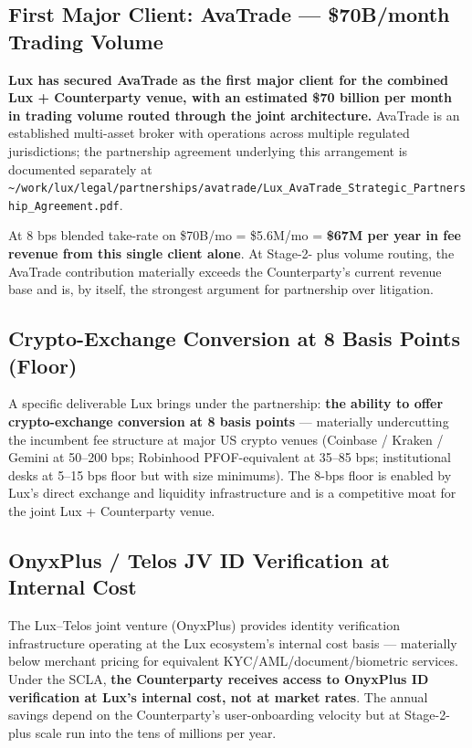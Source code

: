 \documentclass[11pt,letterpaper]{article}
\begin{document}
\subsection*{First Major Client: AvaTrade --- \$70B/month Trading Volume}

\textbf{Lux has secured AvaTrade as the first major client for the
combined Lux + Counterparty venue, with an estimated \$70 billion
per month in trading volume routed through the joint architecture.}
AvaTrade is an established multi-asset broker with operations across
multiple regulated jurisdictions; the partnership agreement
underlying this arrangement is documented separately at
\texttt{\textasciitilde/work/lux/legal/partnerships/avatrade/Lux\_AvaTrade\_Strategic\_Partnership\_Agreement.pdf}.

At 8 bps blended take-rate on \$70B/mo = \$5.6M/mo = \textbf{\$67M
per year in fee revenue from this single client alone}. At Stage-2-
plus volume routing, the AvaTrade contribution materially exceeds
the Counterparty's current revenue base and is, by itself, the
strongest argument for partnership over litigation.

\subsection*{Crypto-Exchange Conversion at 8 Basis Points (Floor)}

A specific deliverable Lux brings under the partnership: \textbf{the
ability to offer crypto-exchange conversion at 8 basis points} ---
materially undercutting the incumbent fee structure at major US
crypto venues (Coinbase / Kraken / Gemini at 50--200 bps; Robinhood
PFOF-equivalent at 35--85 bps; institutional desks at 5--15 bps
floor but with size minimums). The 8-bps floor is enabled by Lux's
direct exchange and liquidity infrastructure and is a competitive
moat for the joint Lux + Counterparty venue.

\subsection*{OnyxPlus / Telos JV ID Verification at Internal Cost}

The Lux--Telos joint venture (OnyxPlus) provides identity verification
infrastructure operating at the Lux ecosystem's internal cost basis
--- materially below merchant pricing for equivalent
KYC/AML/document/biometric services. Under the SCLA, \textbf{the
Counterparty receives access to OnyxPlus ID verification at Lux's
internal cost, not at market rates}. The annual savings depend on
the Counterparty's user-onboarding velocity but at Stage-2-plus
scale run into the tens of millions per year.
\end{document}
